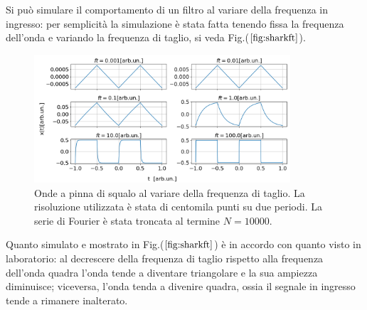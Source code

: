 \documentclass{article}
\begin{document}
                Si può simulare il comportamento di  un filtro al
                variare della frequenza in ingresso: per semplicità 
                la simulazione è stata fatta tenendo fissa la frequenza dell'onda e 
                variando la frequenza di taglio, si veda Fig.($\ref{fig:sharkft}$).
                    \begin{figure}[H]
                        \centering
                        \includegraphics[width=0.85\textwidth]{fousharkfinsfts1.png} %
                        \caption{Onde a pinna di squalo al variare della frequenza di taglio.
                        La risoluzione utilizzata è stata di centomila punti su due periodi.
                        La serie di Fourier è stata troncata al termine $N=10000$.}
                        \label{fig:sharkft}
                    \end{figure}

                \noindent Quanto simulato e mostrato in Fig.($\ref{fig:sharkft}$)
                è in accordo con quanto visto in laboratorio: 
                al decrescere della frequenza di taglio rispetto alla frequenza dell'onda quadra
                l'onda tende a diventare triangolare e la sua ampiezza diminuisce; viceversa,
                l'onda tenda a divenire quadra, ossia il segnale in ingresso tende a 
                rimanere inalterato.
            
            
\end{document}
